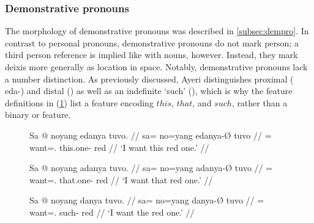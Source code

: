 
\subsubsection{Demonstrative pronouns}
\label{subsubsec:demprosyn}

The morphology of demonstrative pronouns was described in 
\autoref{subsec:dempro}. In contrast to personal pronouns, demonstrative
pronouns do not mark person; a third person reference is implied like with
nouns, however. Instead, they mark deixis more generally as location in space.
Notably, demonstrative pronouns lack a number distinction. As previously
discussed, Ayeri distinguishes proximal ( {eda-}) and distal
() as well as an indefinite `such' (), which is
why the feature definitions in (\ref{ex:dempromorphlex}) list a \Deix{} feature
encoding $this$, $that$, and $such$, rather than a binary \Prox{} or \Dist{}
feature.

\begin{figure}[h]
\begin{morphlex}
\ex\label{ex:dempromorphlex}
\xe
\end{morphlex}
\end{figure}

\begin{figure}
\pex
\a\ljudge\ques\begingl
	\gla Sa @ noyang edanya tuvo. //
	\glb sa= no=yang edanya-Ø tuvo //
	\glc \PatT{}= want=\Fsg{}.\Aarg{} this.one-\Top{} red //
	\glft `I want this red one.' //
\endgl

\a\ljudge\ques\begingl
	\gla Sa @ noyang adanya tuvo. //
	\glb sa= no=yang adanya-Ø tuvo //
	\glc \PatT{}= want=\Fsg{}.\Aarg{} that.one-\Top{} red //
	\glft `I want that red one.' //
\endgl

\a\label{ex:danyatop2}\begingl
	\gla Sa @ noyang danya tuvo. //
	\glb sa= no=yang danya-Ø tuvo //
	\glc \PatT{}= want=\Fsg{}.\Aarg{} such-\Top{} red //
	\glft `I want the red one.' //
\endgl
\xe
\end{figure}

